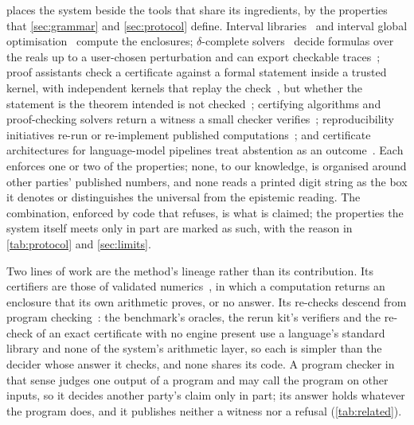 \documentclass[preprint,11pt,a4paper]{elsarticle}
\theoremstyle{definition}
\begin{document}
 places the system beside the tools that share its ingredients, by the properties that \cref{sec:grammar} and \cref{sec:protocol} define. Interval libraries~\citep{Rump99,Johansson17,Benet24} and interval global optimisation~\citep{HansenWalster04,Rump18global} compute the enclosures; $\delta$-complete solvers~\citep{dReal13,Kong18} decide formulas over the reals up to a user-chosen perturbation and can export checkable traces~\citep{Gao14proof}; proof assistants check a certificate against a formal statement inside a trusted kernel, with independent kernels that replay the check~\citep{SolovyevHales13,MartinDorel16,Mahboubi19,Carneiro24}, but whether the statement is the theorem intended is not checked~\citep{Bastounis26,Kallel26}; certifying algorithms and proof-checking solvers return a witness a small checker verifies~\citep{McConnell11,Wetzler14,CakeLPR21}; reproducibility initiatives re-run or re-implement published computations~\citep{Rougier17,ReproBuilds22}; and certificate architectures for language-model pipelines treat abstention as an outcome~\citep{Koomullil26,Li26}. Each enforces one or two of the properties; none, to our knowledge, is organised around other parties' published numbers, and none reads a printed digit string as the box it denotes or distinguishes the universal from the epistemic reading. The combination, enforced by code that refuses, is what is claimed; the properties the system itself meets only in part are marked as such, with the reason in \cref{tab:protocol} and \cref{sec:limits}.

Two lines of work are the method's lineage rather than its contribution. Its certifiers are those of validated numerics~\citep{Rump10,Tucker11}, in which a computation returns an enclosure that its own arithmetic proves, or no answer. Its re-checks descend from program checking~\citep{BlumKannan95}: the benchmark's oracles, the rerun kit's verifiers and the re-check of an exact certificate with no engine present use a language's standard library and none of the system's arithmetic layer, so each is simpler than the decider whose answer it checks, and none shares its code. A program checker in that sense judges one output of a program and may call the program on other inputs, so it decides another party's claim only in part; its answer holds whatever the program does, and it publishes neither a witness nor a refusal (\cref{tab:related}).
\end{document}
